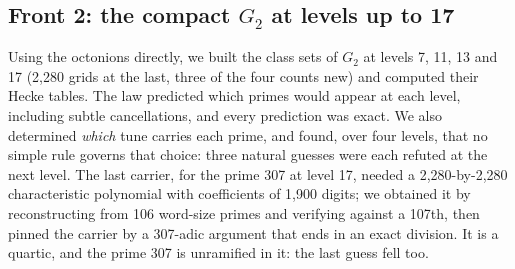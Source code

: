 \documentclass[11pt]{article}
\begin{document}
\subsection{Front 2: the compact $G_2$ at levels up to 17}
Using the octonions directly, we built the class sets of $G_2$ at levels 7, 11, 13 and 17 (2,280 grids at the last, three of the four counts new) and computed their Hecke tables. The law predicted which primes would appear at each level, including subtle cancellations, and every prediction was exact. We also determined \emph{which} tune carries each prime, and found, over four levels, that no simple rule governs that choice: three natural guesses were each refuted at the next level. The last carrier, for the prime 307 at level 17, needed a 2,280-by-2,280 characteristic polynomial with coefficients of 1,900 digits; we obtained it by reconstructing from 106 word-size primes and verifying against a 107th, then pinned the carrier by a 307-adic argument that ends in an exact division. It is a quartic, and the prime 307 is unramified in it: the last guess fell too.
\end{document}
